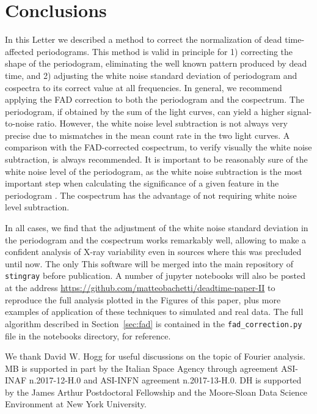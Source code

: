 \documentclass[twocolumn]{aastex61}
\begin{document}
\section{Conclusions}
In this Letter we described a method to correct the normalization of dead time-affected periodograms.
This method is valid in principle for 
1) correcting the shape of the periodogram, eliminating the well known pattern produced by dead time, and 
2) adjusting the white noise standard deviation of periodogram and cospectra to its correct value at all frequencies.
In general, we recommend applying the FAD correction to both the periodogram and the cospectrum. 
The periodogram, if obtained by the sum of the light curves, can yield a higher signal-to-noise ratio.
However, the white noise level subtraction is not always very precise due to mismatches in the mean count rate in the two light curves. 
A comparison with the FAD-corrected cospectrum, to verify visually the white noise subtraction, is always recommended.
It is important to be reasonably sure of the white noise level of the periodogram, as the white noise subtraction is the most important step when calculating the significance of a given feature in the periodogram \citep[e.g.][]{Barret+12,Huppenkothen+17}.
The cospectrum has the advantage of not requiring white noise level subtraction.

In all cases, we find that the adjustment of the white noise standard deviation in the periodogram and the cospectrum works remarkably well, allowing to make a confident analysis of X-ray variability even in sources where this was precluded until now.
The only 
This software will be merged into the main repository of \texttt{stingray} before publication.
A number of jupyter notebooks will also be posted at the address \href{https://github.com/matteobachetti/deadtime-paper-II}{https://github.com/matteobachetti/deadtime-paper-II} to reproduce the full analysis plotted in the Figures of this paper, plus more examples of application of these techniques to simulated and real data.
The full algorithm described in Section~\ref{sec:fad} is contained in the \texttt{fad\_correction.py} file in the notebooks directory, for reference.


\acknowledgments
We thank David W. Hogg for useful discussions on the topic of Fourier analysis.
MB is supported in part by the Italian Space Agency through agreement ASI-INAF n.2017-12-H.0 and ASI-INFN agreement n.2017-13-H.0.
DH is supported by the James Arthur Postdoctoral Fellowship and the Moore-Sloan Data Science Environment at New York University.
\end{document}
